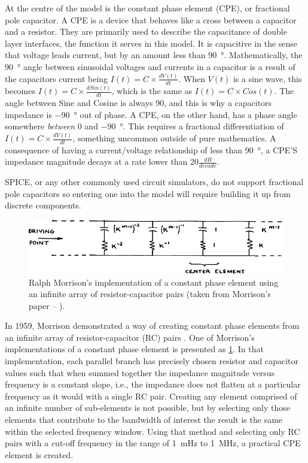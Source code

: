     At the centre of the model is the constant phase element (CPE), or fractional pole capacitor.
    A CPE is a device that behaves like a cross between a capacitor and a resistor.
    They are primarily used to describe the capacitance of double layer interfaces, the function it serves in this model.
    It is capacitive in the sense that voltage leads current, but by an amount less than \SI{90}{\degree}.
    Mathematically, the \SI{90}{\degree} angle between sinusoidal voltages and currents in a capacitor is a result of the capacitors current being $I(t) = C \times \frac{dV(t)}{dt}$.
    When $V(t)$ is a sine wave, this becomes $I(t) = C \times \frac{d Sin(t)}{dt}$, which is the same as $I(t) = C \times Cos(t)$.
    The angle between Sine and Cosine is always 90, and this is why a capacitors impedance is \SI{-90}{\degree} out of phase.
    A CPE, on the other hand, has a phase angle somewhere \emph{between} 0 and \SI{-90}{\degree}.
    This requires a fractional differentiation of $I(t) = C \times \frac{dV(t)}{dt}$, something uncommon outside of pure mathematics.
    A consequence of having a current/voltage relationship of less than \SI{90}{\degree}, a CPE'S impedance magnitude decays at a rate lower than 20$\frac{dB}{decade}$.

    SPICE, or any other commonly used circuit simulators, do not support fractional pole capacitors so entering one into the model will require building it up from discrete components.
    \begin{figure}[h]
      \centering
      \includegraphics{content/pt2/07-InterfaceModel/graphics/Morrison-RC}
      \caption{\label{graph:pt2-morrisonCPE}Ralph Morrison's implementation of a constant phase element using an infinite array of resistor-capacitor pairs (taken from Morrison's paper -- \cite{Morrison1959}).}
    \end{figure}
    In 1959, Morrison demonstrated a way of creating constant phase elements from an infinite array of resistor-capacitor (RC) pairs \cite{Morrison1959}.
    One of Morrison's implementations of a constant phase element is presented as \cref{graph:pt2-morrisonCPE}.
    In that implementation, each parallel branch has precisely chosen resistor and capacitor values such that when summed together the impedance magnitude versus frequency is a constant slope, i.e., the impedance does not flatten at a particular frequency as it would with a single RC pair.
    Creating any element comprised of an infinite number of sub-elements is not possible, but by selecting only those elements that contribute to the bandwidth of interest the result is the same within the selected frequency window.
    Using that method and selecting only RC pairs with a cut-off frequency in the range of \SI{1}{\milli\hertz} to \SI{1}{\mega\hertz}, a practical CPE element is created.

